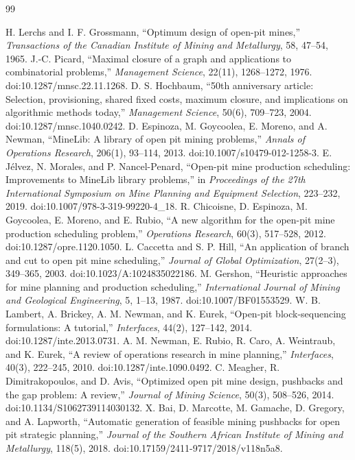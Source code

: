 \documentclass[11pt]{article}
\begin{document}
\begin{thebibliography}{99}
\raggedright
{} H. Lerchs and I. F. Grossmann, ``Optimum design of open-pit mines,'' \emph{Transactions of the Canadian Institute of Mining and Metallurgy}, 58, 47--54, 1965.
 J.-C. Picard, ``Maximal closure of a graph and applications to combinatorial problems,'' \emph{Management Science}, 22(11), 1268--1272, 1976. doi:10.1287/mnsc.22.11.1268.
 D. S. Hochbaum, ``50th anniversary article: Selection, provisioning, shared fixed costs, maximum closure, and implications on algorithmic methods today,'' \emph{Management Science}, 50(6), 709--723, 2004. doi:10.1287/mnsc.1040.0242.
 D. Espinoza, M. Goycoolea, E. Moreno, and A. Newman, ``MineLib: A library of open pit mining problems,'' \emph{Annals of Operations Research}, 206(1), 93--114, 2013. doi:10.1007/s10479-012-1258-3.
 E. J\'elvez, N. Morales, and P. Nancel-Penard, ``Open-pit mine production scheduling: Improvements to MineLib library problems,'' in \emph{Proceedings of the 27th International Symposium on Mine Planning and Equipment Selection}, 223--232, 2019. doi:10.1007/978-3-319-99220-4\_18.
 R. Chicoisne, D. Espinoza, M. Goycoolea, E. Moreno, and E. Rubio, ``A new algorithm for the open-pit mine production scheduling problem,'' \emph{Operations Research}, 60(3), 517--528, 2012. doi:10.1287/opre.1120.1050.
 L. Caccetta and S. P. Hill, ``An application of branch and cut to open pit mine scheduling,'' \emph{Journal of Global Optimization}, 27(2--3), 349--365, 2003. doi:10.1023/A:1024835022186.
 M. Gershon, ``Heuristic approaches for mine planning and production scheduling,'' \emph{International Journal of Mining and Geological Engineering}, 5, 1--13, 1987. doi:10.1007/BF01553529.
 W. B. Lambert, A. Brickey, A. M. Newman, and K. Eurek, ``Open-pit block-sequencing formulations: A tutorial,'' \emph{Interfaces}, 44(2), 127--142, 2014. doi:10.1287/inte.2013.0731.
 A. M. Newman, E. Rubio, R. Caro, A. Weintraub, and K. Eurek, ``A review of operations research in mine planning,'' \emph{Interfaces}, 40(3), 222--245, 2010. doi:10.1287/inte.1090.0492.
 C. Meagher, R. Dimitrakopoulos, and D. Avis, ``Optimized open pit mine design, pushbacks and the gap problem: A review,'' \emph{Journal of Mining Science}, 50(3), 508--526, 2014. doi:10.1134/S1062739114030132.
 X. Bai, D. Marcotte, M. Gamache, D. Gregory, and A. Lapworth, ``Automatic generation of feasible mining pushbacks for open pit strategic planning,'' \emph{Journal of the Southern African Institute of Mining and Metallurgy}, 118(5), 2018. doi:10.17159/2411-9717/2018/v118n5a8.

\end{thebibliography}
\end{document}
